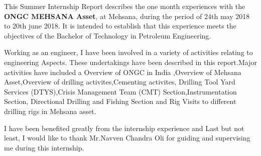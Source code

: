 \documentclass[11pt,a4paper]{report}
\makeatletter
\newcommand\mainmatter{%
    \cleardoublepage
  \pagenumbering{arabic}}
\makeatother
\begin{document}

This  Summer Internship Report  describes the one month experiences with the \textbf{ONGC MEHSANA Asset}, at Mehsana,
during the period of 24th may 2018 to 20th june 2018. It is  intended to  establish that this  experience 
meets  the  objectives  of the Bachelor of Technology in Petroleum Engineering.

\vspace{1em}

Working as  an engineer, I  have been  involved  in  a variety of activities  relating to engineering Aspects.
These  undertakings have been  described  in this  report.Major activities  have  included a Overview of ONGC 
in India ,Overview of Mehsana Asset,Overview of drilling activites,Cementing activites,
Drilling Tool Yard Services (DTYS),Crisis Management Team (CMT) Section,Instrumentation Section, 
Directional Drilling and Fishing Section and Rig Visits to different drilling rigs in Mehsana asset.

\vspace{1em}

I have been benefited greatly  from the internship experience and Last but not least,
I would like to thank Mr.Navven Chandra Oli for guiding  and supervising me during this internship. 

\newpage


\listoftables



\listoffigures



\mainmatter

\singlespacing






















\end{document}
